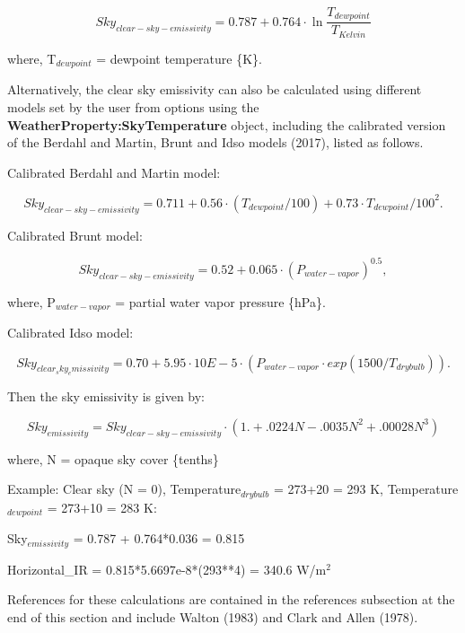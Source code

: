 \begin{equation}
Sky_{clear-sky-emissivity} = 0.787 + 0.764\cdot \ln \frac {T_{dewpoint}}{T_{Kelvin}}
\end{equation}

where, T\(_{dewpoint}\) = dewpoint temperature \{K\}.

Alternatively, the clear sky emissivity can also be calculated using different models set by the user from options using the \textbf{WeatherProperty:SkyTemperature} object, including the calibrated version of the Berdahl and Martin, Brunt and Idso models (2017), listed as follows.

Calibrated Berdahl and Martin model:

\begin{equation}
Sky_{clear-sky-emissivity} = 0.711 + 0.56\cdot(T_{dewpoint} / 100) + 0.73\cdot{T_{dewpoint} / 100}^2.
\end{equation}

Calibrated Brunt model:

\begin{equation}
Sky_{clear-sky-emissivity} = 0.52 + 0.065\cdot(P_{water-vapor})^0.5,
\end{equation}

where, P\(_{water-vapor}\) = partial water vapor pressure \{hPa\}.

Calibrated Idso model:

\begin{equation}
Sky_{clear_sky_emissivity} = 0.70 + 5.95\cdot10E-5\cdot(P_{water-vapor} \cdot exp(1500/T_{drybulb})).
\end{equation}


Then the sky emissivity is given by:

\begin{equation}
Sky_{emissivity} = Sky_{clear-sky-emissivity} \cdot \left( {1. + .0224N - .0035{N^2} + .00028{N^3}} \right)
\end{equation}

where, N = opaque sky cover \{tenths\}

Example: Clear sky (N = 0), Temperature\(_{drybulb}\) = 273+20 = 293 K, Temperature\(_{dewpoint}\) = 273+10 = 283 K:

Sky\(_{emissivity}\) = 0.787 + 0.764*0.036 = 0.815

Horizontal\_IR = 0.815*5.6697e-8*(293**4) = 340.6 W/m\(^{2}\)

References for these calculations are contained in the references subsection at the end of this  section and include Walton (1983) and Clark and Allen (1978).

